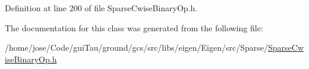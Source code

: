 Definition at line 200 of file Sparse\-Cwise\-Binary\-Op.\-h.



The documentation for this class was generated from the following file\-:\begin{DoxyCompactItemize}
\item 
/home/jose/\-Code/gui\-Tau/ground/gcs/src/libs/eigen/\-Eigen/src/\-Sparse/\hyperlink{_sparse_cwise_binary_op_8h}{Sparse\-Cwise\-Binary\-Op.\-h}\end{DoxyCompactItemize}
